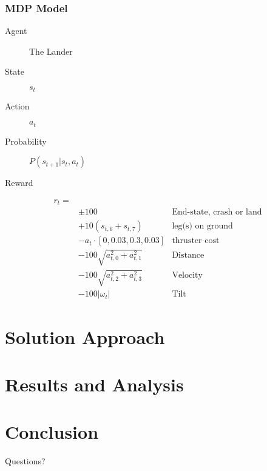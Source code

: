 \documentclass{beamer}
\begin{document}
\begin{frame}
    \frametitle{MDP Model}
    \begin{description}
        \item[Agent] The Lander
        \item[State] \(s_t\)
        \item[Action] \(a_t\)
        \item[Probability] \(P(s_{t+1}|s_t,a_t)\)
        \item[Reward] 
    \end{description}
    \begin{align*}
        r_t = \\
        & \pm 100                   & \text{End-state, crash or land} \\
        & +10 (s_{t,6} + s_{t,7})   & \text{leg(s) on ground} \\
        & -a_t\cdot [0,0.03,0.3,0.03] & \text{thruster cost} \\
        & - 100\sqrt{a_{t,0}^2+a_{t,1}^2} & \text{Distance} \\
        & - 100\sqrt{a_{t,2}^2+a_{t,3}^2} & \text{Velocity} \\
        & - 100|\omega_t| & \text{Tilt}
    \end{align*}
\end{frame}

\section{Solution Approach}

\section{Results and Analysis}

\section{Conclusion}




\begin{frame}
    Questions?
\end{frame}
\end{document}
